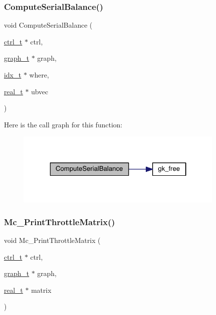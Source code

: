 \mbox{\label{a00969_a48a74c9a48910c6ac34c15a4d0ab41b7}} 
\subsubsection{\texorpdfstring{Compute\+Serial\+Balance()}{ComputeSerialBalance()}}
{\footnotesize\ttfamily void Compute\+Serial\+Balance (\begin{DoxyParamCaption}\item[{\hyperlink{a00742}{ctrl\+\_\+t} $\ast$}]{ctrl,  }\item[{\hyperlink{a00734}{graph\+\_\+t} $\ast$}]{graph,  }\item[{\hyperlink{a00876_aaa5262be3e700770163401acb0150f52}{idx\+\_\+t} $\ast$}]{where,  }\item[{\hyperlink{a00876_a1924a4f6907cc3833213aba1f07fcbe9}{real\+\_\+t} $\ast$}]{ubvec }\end{DoxyParamCaption})}

Here is the call graph for this function\+:\nopagebreak
\begin{figure}[H]
\begin{center}
\leavevmode
\includegraphics[width=286pt]{a00969_a48a74c9a48910c6ac34c15a4d0ab41b7_cgraph}
\end{center}
\end{figure}
\mbox{\label{a00969_a48f286a4f71519dfc8262f34746495f9}} 
\subsubsection{\texorpdfstring{Mc\+\_\+\+Print\+Throttle\+Matrix()}{Mc\_PrintThrottleMatrix()}}
{\footnotesize\ttfamily void Mc\+\_\+\+Print\+Throttle\+Matrix (\begin{DoxyParamCaption}\item[{\hyperlink{a00742}{ctrl\+\_\+t} $\ast$}]{ctrl,  }\item[{\hyperlink{a00734}{graph\+\_\+t} $\ast$}]{graph,  }\item[{\hyperlink{a00876_a1924a4f6907cc3833213aba1f07fcbe9}{real\+\_\+t} $\ast$}]{matrix }\end{DoxyParamCaption})}

